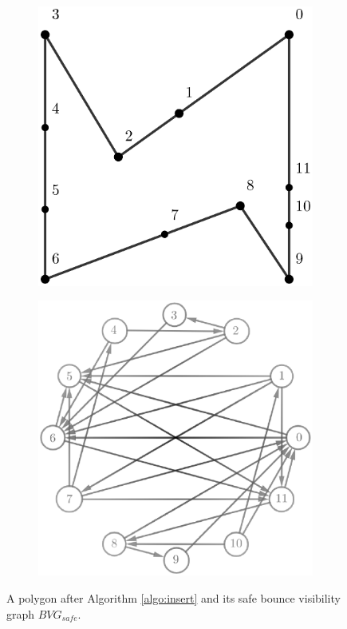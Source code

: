 \documentclass[sageh,times,Review]{sagej}
\begin{document}
\begin{figure}
\centering
\begin{subfigure}{0.5\columnwidth}
\centering
\includegraphics[width=0.9\linewidth]{simple_bit_inserted.eps}
\end{subfigure}%
\begin{subfigure}{0.5\columnwidth}
\centering
\includegraphics[width=0.9\linewidth]{simple_bit_safe_graph.eps}
\end{subfigure}
\caption{A polygon after Algorithm \ref{algo:insert} and its safe bounce visibility graph $BVG_{safe}$. }
\label{fig:simple_bit}
\end{figure}
\end{document}
